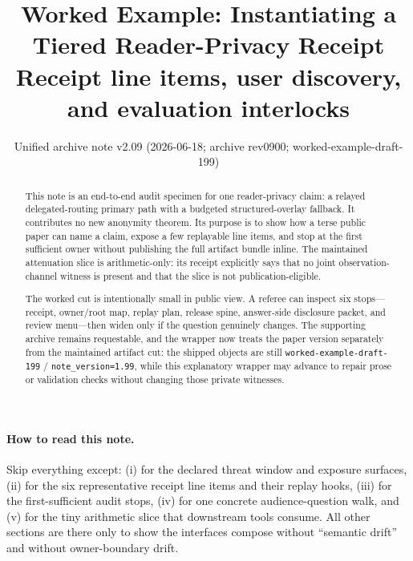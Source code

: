 \documentclass[11pt]{article}
\title{Worked Example: Instantiating a Tiered Reader-Privacy Receipt\\
\large Receipt line items, user discovery, and evaluation interlocks}
\author{}
\date{Unified archive note v2.09 (2026-06-18; archive rev0900; worked-example-draft-199)}
\begin{document}
\maketitle

\begin{abstract}
This note is an end-to-end audit specimen for one reader-privacy claim: a relayed delegated-routing primary path with a budgeted structured-overlay fallback.
It contributes no new anonymity theorem.
Its purpose is to show how a terse public paper can name a claim, expose a few replayable line items, and stop at the first sufficient owner without publishing the full artifact bundle inline. The maintained attenuation slice is arithmetic-only: its receipt explicitly says that no joint observation-channel witness is present and that the slice is not publication-eligible.

The worked cut is intentionally small in public view.
A referee can inspect six stops---receipt, owner/root map, replay plan, release spine, answer-side disclosure packet, and review menu---then widen only if the question genuinely changes.
The supporting archive remains requestable, and the wrapper now treats the paper version separately from the maintained artifact cut: the shipped objects are still \texttt{worked-example-draft-199} / \texttt{note\_version=1.99}, while this explanatory wrapper may advance to repair prose or validation checks without changing those private witnesses.
\end{abstract}

\paragraph{How to read this note.}
Skip everything except:
(i)  for the declared threat window and exposure surfaces,
(ii)  for the six representative receipt line items and their replay hooks,
(iii)  for the first-sufficient audit stops,
(iv)  for one concrete audience-question walk, and
(v)  for the tiny arithmetic slice that downstream tools consume.
All other sections are there only to show the interfaces compose without ``semantic drift'' and without owner-boundary drift.
\end{document}
